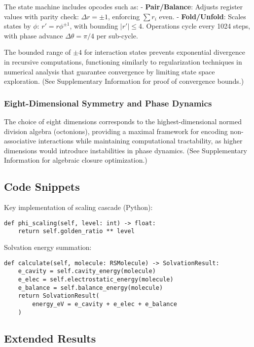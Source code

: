 \documentclass[twocolumn,prd,amsmath,amssymb,aps,superscriptaddress,nofootinbib]{revtex4-2}
\begin{document}
The state machine includes opcodes such as:
- \textbf{Pair/Balance}: Adjusts register values with parity check: $\Delta r = \pm 1$, enforcing $\sum r_i$ even.
- \textbf{Fold/Unfold}: Scales states by $\phi$: $r' = r \phi^{\pm1}$, with bounding $|r'| \leq 4$.
Operations cycle every 1024 steps, with phase advance $\Delta\theta = \pi/4$ per sub-cycle.

The bounded range of $\pm 4$ for interaction states prevents exponential divergence in recursive computations, functioning similarly to regularization techniques in numerical analysis that guarantee convergence by limiting state space exploration. (See Supplementary Information for proof of convergence bounds.)

\subsubsection{Eight-Dimensional Symmetry and Phase Dynamics}

The choice of eight dimensions corresponds to the highest-dimensional normed division algebra (octonions), providing a maximal framework for encoding non-associative interactions while maintaining computational tractability, as higher dimensions would introduce instabilities in phase dynamics. (See Supplementary Information for algebraic closure optimization.)

\subsection{Code Snippets}

Key implementation of scaling cascade (Python):
\begin{verbatim}
def phi_scaling(self, level: int) -> float:
    return self.golden_ratio ** level
\end{verbatim}

Solvation energy summation:
\begin{verbatim}
def calculate(self, molecule: RSMolecule) -> SolvationResult:
    e_cavity = self.cavity_energy(molecule)
    e_elec = self.electrostatic_energy(molecule)
    e_balance = self.balance_energy(molecule)
    return SolvationResult(
        energy_eV = e_cavity + e_elec + e_balance
    )
\end{verbatim}

\subsection{Extended Results}
\end{document}
